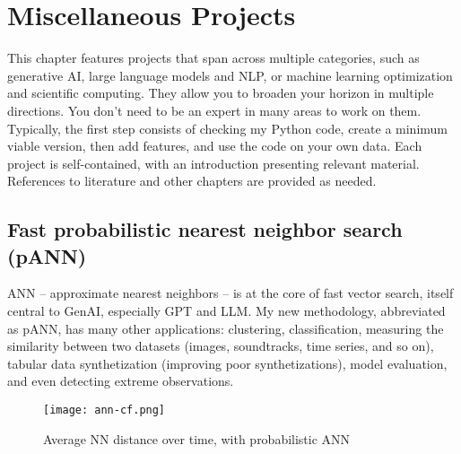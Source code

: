 \documentclass[oneside,10pt]{book}
\begin{document}

\chapter{Miscellaneous Projects}

This chapter features projects that span across multiple categories, such as generative AI, large language models and NLP, or machine learning optimization and scientific computing. They allow you to broaden your horizon in multiple directions. You don't need to be an expert in many areas to work on them. 
 Typically,  the first step consists of checking my Python code, create a minimum viable version, then add features, and use the code on your own data. Each
 project is self-contained, with an introduction presenting relevant material. References to literature and other chapters are provided as needed.  


\section{Fast probabilistic nearest neighbor search (pANN)}\label{f8v2koyuy}

ANN -- \textcolor{index}{approximate nearest neighbors} --  is at the core of fast 
\textcolor{index}{vector search}, itself central to GenAI, especially GPT and LLM. My new methodology, abbreviated as pANN, has many other applications: clustering, classification, measuring the similarity between two datasets (images, soundtracks, time series, and so on), tabular data synthetization (improving poor synthetizations), model evaluation, and even detecting extreme observations.

\begin{figure}[H]
\centering
\texttt{[image: ann-cf.png]}
\caption{Average NN distance over time, with probabilistic ANN}
\label{fig:gmlp9ut}
\end{figure}
\end{document}
